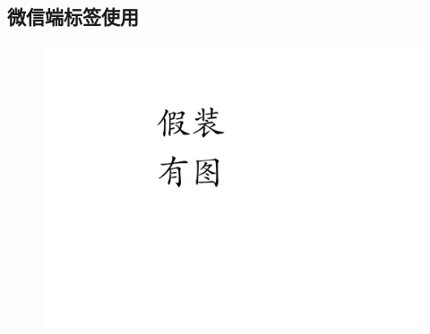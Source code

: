 \documentclass[UTF8]{ctexart}
\begin{document}
\newpage
\subsection{微信端标签使用}
\begin{figure}[h]
    \centering
    \includegraphics[width=\textwidth]{manual_images//temp.png}
\end{figure}
\end{document}
